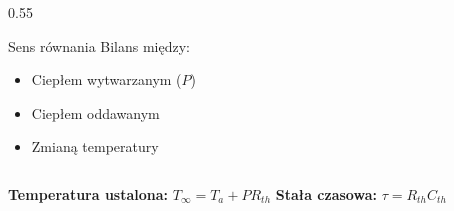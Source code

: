\documentclass[10pt, aspectratio=169, t]{beamer}
\begin{document}
\begin{frame}
\begin{columns}[T]
\begin{column}{0.55\textwidth}
			\vspace{0.1cm}
			
			\begin{block}{Sens równania}
				\tiny
				Bilans między:
				\begin{itemize}
					\item Ciepłem wytwarzanym ($P$)
					\item Ciepłem oddawanym
					\item Zmianą temperatury
				\end{itemize}
			\end{block}
		\end{column}
	\end{columns}
	
	\vspace{0.1cm}
	
	\begin{center}
		\scriptsize
		\textbf{Temperatura ustalona:} $T_\infty = T_a + PR_{th}$ \quad \textbf{Stała czasowa:} $\tau = R_{th}C_{th}$
	\end{center}
\end{frame}
%
%
%
%	
%	
%	
%	
%
%
%
%	
%	
%	
\end{document}
